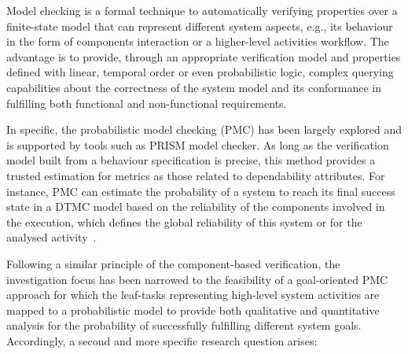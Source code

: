 


Model checking is a formal technique to automatically verifying properties over a finite-state model that can represent different system aspects, e.g., its behaviour in the form of components interaction or a higher-level activities workflow. The advantage is to provide, through an appropriate verification model and properties defined with linear, temporal order or even probabilistic logic, complex querying capabilities about the correctness of the system model and its conformance in fulfilling both functional and non-functional requirements.

In specific, the probabilistic model checking (PMC) has been largely explored and is supported by tools such as PRISM model checker. As long as the verification model built from a behaviour specification is precise, this method provides a trusted estimation for metrics as those related to dependability attributes. For instance, PMC can estimate the probability of a system to reach its final success state in a DTMC model based on the reliability of the components involved in the execution, which defines the global reliability of this system or for the analysed activity~\cite{Baier:2008, Nunes:2012}.

Following a similar principle of the component-based verification, the investigation focus has been narrowed to the feasibility of a goal-oriented PMC approach for which the leaf-tasks representing high-level system activities are mapped to a probabilistic model to provide both qualitative and quantitative analysis for the probability of successfully fulfilling different system goals. Accordingly, a second and more specific research question arises:

\bigskip

\setlength{\fboxsep}{10pt}
\noindent{}\bigskip


